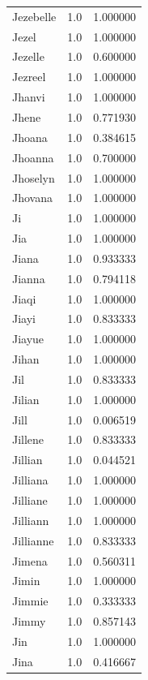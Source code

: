 \documentclass[
  letterpaper,
  DIV=11,
  numbers=noendperiod]{scrreprt}
\begin{document}
\begin{tabular}{lrr}
Jezebelle       &   1.0 &   1.000000 \\
Jezel           &   1.0 &   1.000000 \\
Jezelle         &   1.0 &   0.600000 \\
Jezreel         &   1.0 &   1.000000 \\
Jhanvi          &   1.0 &   1.000000 \\
Jhene           &   1.0 &   0.771930 \\
Jhoana          &   1.0 &   0.384615 \\
Jhoanna         &   1.0 &   0.700000 \\
Jhoselyn        &   1.0 &   1.000000 \\
Jhovana         &   1.0 &   1.000000 \\
Ji              &   1.0 &   1.000000 \\
Jia             &   1.0 &   1.000000 \\
Jiana           &   1.0 &   0.933333 \\
Jianna          &   1.0 &   0.794118 \\
Jiaqi           &   1.0 &   1.000000 \\
Jiayi           &   1.0 &   0.833333 \\
Jiayue          &   1.0 &   1.000000 \\
Jihan           &   1.0 &   1.000000 \\
Jil             &   1.0 &   0.833333 \\
Jilian          &   1.0 &   1.000000 \\
Jill            &   1.0 &   0.006519 \\
Jillene         &   1.0 &   0.833333 \\
Jillian         &   1.0 &   0.044521 \\
Jilliana        &   1.0 &   1.000000 \\
Jilliane        &   1.0 &   1.000000 \\
Jilliann        &   1.0 &   1.000000 \\
Jillianne       &   1.0 &   0.833333 \\
Jimena          &   1.0 &   0.560311 \\
Jimin           &   1.0 &   1.000000 \\
Jimmie          &   1.0 &   0.333333 \\
Jimmy           &   1.0 &   0.857143 \\
Jin             &   1.0 &   1.000000 \\
Jina            &   1.0 &   0.416667 \\

\end{tabular}
\end{document}
